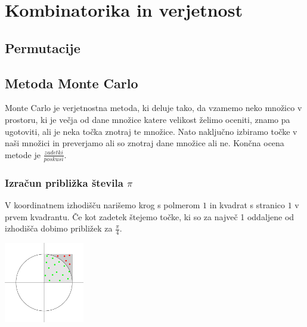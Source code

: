\documentclass[10pt,a4paper,oneside]{book}
\begin{document}
\chapter{Kombinatorika in verjetnost}
\section{Permutacije}


\section{Metoda Monte Carlo}
Monte Carlo je verjetnostna metoda, ki deluje tako, da vzamemo neko množico v prostoru, ki je večja od dane množice katere velikost želimo oceniti, znamo pa ugotoviti, ali je neka točka znotraj te množice. Nato naključno izbiramo točke v naši množici in preverjamo ali so znotraj dane množice ali ne. Končna ocena metode je $\frac{zadetki}{poskusi}$.
\subsection{Izračun približka števila $\pi$}
V koordinatnem izhodišču narišemo krog s polmerom $1$ in kvadrat s stranico $1$ v prvem kvadrantu. Če kot zadetek štejemo točke, ki so za največ 1 oddaljene od izhodišča dobimo približek za $\frac{\pi}{4}$.

\begin{center}
	\includegraphics[width=35mm]{MonteCarloPi}

\end{center}
\end{document}
